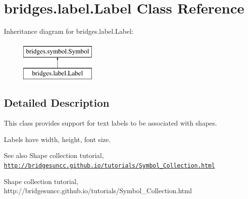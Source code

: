 \hypertarget{classbridges_1_1label_1_1_label}{}\section{bridges.\+label.\+Label Class Reference}
\label{classbridges_1_1label_1_1_label}
Inheritance diagram for bridges.\+label.\+Label\+:\begin{figure}[H]
\begin{center}
\leavevmode
\includegraphics[height=2.000000cm]{classbridges_1_1label_1_1_label}
\end{center}
\end{figure}


\subsection{Detailed Description}
This class provides support for text labels to be associated with shapes. 

Labels have width, height, font size.

\begin{DoxySeeAlso}{See also}
Shape collection tutorial, \href{http://bridgesuncc.github.io/tutorials/Symbol_Collection.html}{\tt http\+://bridgesuncc.\+github.\+io/tutorials/\+Symbol\+\_\+\+Collection.\+html}
\end{DoxySeeAlso}
\begin{DoxyVerb}\sa Shape collection tutorial, http://bridgesuncc.github.io/tutorials/Symbol_Collection.html\end{DoxyVerb}
